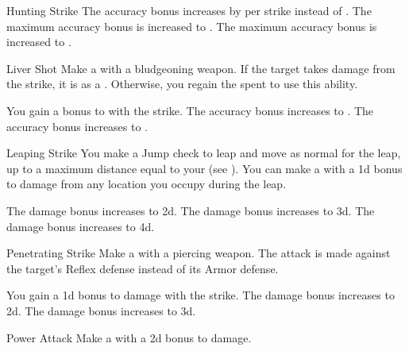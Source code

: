 {\begin{freeability}{Hunting Strike}
                \rankline
                 The accuracy bonus increases by  per strike instead of .
                 The maximum accuracy bonus is increased to .
                 The maximum accuracy bonus is increased to .
            \end{freeability}

            \begin{apability}{Liver Shot}
                Make a  with a bludgeoning weapon.
                If the target takes damage from the strike, it is \sickened as a .
                Otherwise, you regain the  spent to use this ability.

                \rankline
                 You gain a  bonus to  with the strike.
                 The accuracy bonus increases to .
                 The accuracy bonus increases to .
            \end{apability}

            \begin{apability}{Leaping Strike}
                You make a Jump check to leap and move as normal for the leap, up to a maximum distance equal to your  (see ).
                You can make a  with a \plus1d bonus to damage from any location you occupy during the leap.

                \rankline
                 The damage bonus increases to \plus2d.
                 The damage bonus increases to \plus3d.
                 The damage bonus increases to \plus4d.
            \end{apability}

            \begin{apability}{Penetrating Strike}
                Make a  with a piercing weapon.
                The attack is made against the target's Reflex defense instead of its Armor defense.

                \rankline
                 You gain a \plus1d bonus to damage with the strike.
                 The damage bonus increases to \plus2d.
                 The damage bonus increases to \plus3d.
            \end{apability}

            \begin{apability}{Power Attack}
                Make a  with a \plus2d bonus to damage.


\end{apability}}
